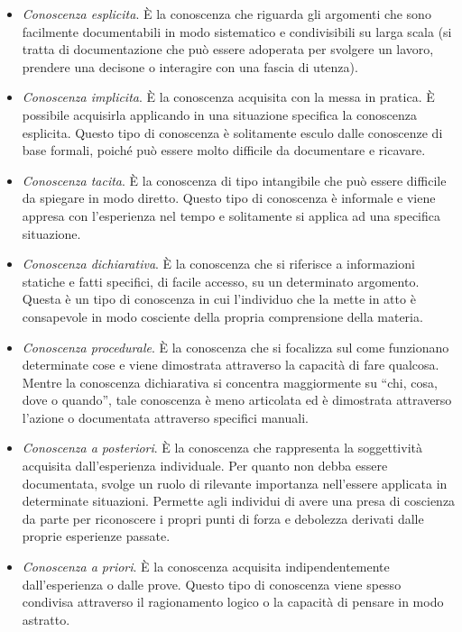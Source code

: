 \begin{itemize}
    \item \textit{Conoscenza esplicita}. È la conoscenza che riguarda gli argomenti che sono facilmente documentabili in modo sistematico e condivisibili su larga scala (si tratta di documentazione che può essere adoperata per svolgere un lavoro, prendere una decisone o interagire con una fascia di utenza).
    \item \textit{Conoscenza implicita}. È la conoscenza acquisita con la messa in pratica. È possibile acquisirla applicando in una situazione specifica la conoscenza esplicita. Questo tipo di conoscenza è solitamente esculo dalle conoscenze di base formali, poiché può essere molto difficile da documentare e ricavare.
    \item \textit{Conoscenza tacita}. È la conoscenza di tipo intangibile che può essere difficile da spiegare in modo diretto. Questo tipo di conoscenza è informale e viene appresa con l’esperienza nel tempo e solitamente si applica ad una specifica situazione. 
    \item \textit{Conoscenza dichiarativa}. È la conoscenza che si riferisce a informazioni statiche e fatti specifici, di facile accesso, su un determinato argomento. Questa è un tipo di conoscenza in cui l’individuo che la mette in atto è consapevole in modo cosciente della propria comprensione della materia.
    \item \textit{Conoscenza procedurale}. È la conoscenza che si focalizza sul come funzionano determinate cose e viene dimostrata attraverso la capacità di fare qualcosa. Mentre la conoscenza dichiarativa si concentra maggiormente su “chi, cosa, dove o quando”, tale conoscenza è meno articolata ed è dimostrata attraverso l’azione o documentata attraverso specifici manuali.
    \item \textit{Conoscenza a posteriori}. È la conoscenza che rappresenta la soggettività acquisita dall’esperienza individuale. Per quanto non debba essere documentata, svolge un ruolo di rilevante importanza nell’essere applicata in determinate situazioni. Permette agli individui di avere una presa di coscienza da parte per riconoscere i propri punti di forza e debolezza derivati dalle proprie esperienze passate.
    \item \textit{Conoscenza a priori}. È la conoscenza acquisita indipendentemente dall’esperienza o dalle prove. Questo tipo di conoscenza viene spesso condivisa attraverso il ragionamento logico o la capacità di pensare in modo astratto.
\end{itemize}


